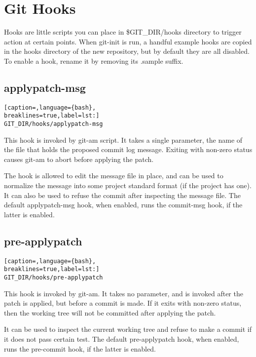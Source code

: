 \section{Git Hooks}
Hooks are little scripts you can place in \$GIT\_DIR/hooks directory to trigger
action at certain points. When git-init is run, a handful example hooks are
copied in the hooks directory of the new repository, but by default they are
all disabled. To enable a hook, rename it by removing its .sample suffix.

\subsection{applypatch-msg}
\lstset{basicstyle=\scriptsize, numbers=none, captionpos=b, tabsize=4}
\begin{lstlisting}[caption=,language={bash},
breaklines=true,label=lst:]
GIT_DIR/hooks/applypatch-msg
\end{lstlisting}

This hook is invoked by git-am script. It takes a single parameter, the name of
the file that holds the proposed commit log message. Exiting with non-zero
status causes git-am to abort before applying the patch.

The hook is allowed to edit the message file in place, and can be used to
normalize the message into some project standard format (if the project has
one). It can also be used to refuse the commit after inspecting the message
file. The default applypatch-msg hook, when enabled, runs the commit-msg hook,
if the latter is enabled.

\subsection{pre-applypatch}
\lstset{basicstyle=\scriptsize, numbers=none, captionpos=b, tabsize=4}
\begin{lstlisting}[caption=,language={bash},
breaklines=true,label=lst:]
GIT_DIR/hooks/pre-applypatch
\end{lstlisting}

This hook is invoked by git-am. It takes no parameter, and is invoked after the
patch is applied, but before a commit is made. If it exits with non-zero
status, then the working tree will not be committed after applying the patch.

It can be used to inspect the current working tree and refuse to make a commit
if it does not pass certain test. The default pre-applypatch hook, when
enabled, runs the pre-commit hook, if the latter is enabled.

